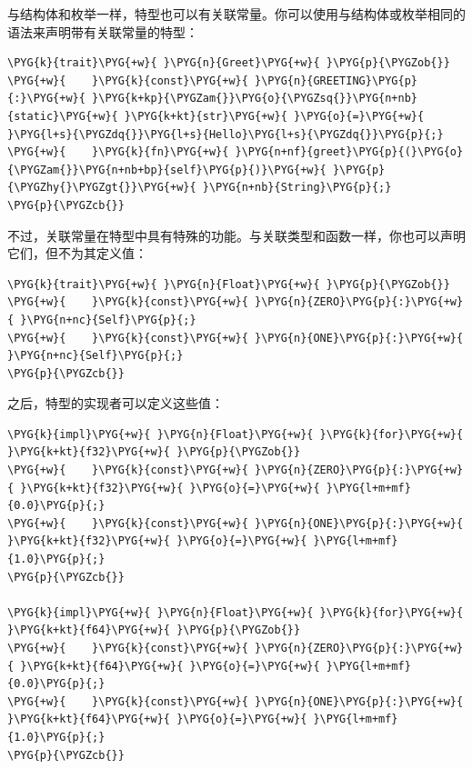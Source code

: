 与结构体和枚举一样，特型也可以有关联常量。你可以使用与结构体或枚举相同的语法来声明带有关联常量的特型：

\begin{Verbatim}[commandchars=\\\{\},breaklines=true,breakanywhere=true,fontsize=\codefont,xleftmargin=17bp]
\PYG{k}{trait}\PYG{+w}{ }\PYG{n}{Greet}\PYG{+w}{ }\PYG{p}{\PYGZob{}}
\PYG{+w}{    }\PYG{k}{const}\PYG{+w}{ }\PYG{n}{GREETING}\PYG{p}{:}\PYG{+w}{ }\PYG{k+kp}{\PYGZam{}}\PYG{o}{\PYGZsq{}}\PYG{n+nb}{static}\PYG{+w}{ }\PYG{k+kt}{str}\PYG{+w}{ }\PYG{o}{=}\PYG{+w}{ }\PYG{l+s}{\PYGZdq{}}\PYG{l+s}{Hello}\PYG{l+s}{\PYGZdq{}}\PYG{p}{;}
\PYG{+w}{    }\PYG{k}{fn}\PYG{+w}{ }\PYG{n+nf}{greet}\PYG{p}{(}\PYG{o}{\PYGZam{}}\PYG{n+nb+bp}{self}\PYG{p}{)}\PYG{+w}{ }\PYG{p}{\PYGZhy{}\PYGZgt{}}\PYG{+w}{ }\PYG{n+nb}{String}\PYG{p}{;}
\PYG{p}{\PYGZcb{}}
\end{Verbatim}

不过，关联常量在特型中具有特殊的功能。与关联类型和函数一样，你也可以声明它们，但不为其定义值：

\begin{Verbatim}[commandchars=\\\{\},breaklines=true,breakanywhere=true,fontsize=\codefont,xleftmargin=17bp]
\PYG{k}{trait}\PYG{+w}{ }\PYG{n}{Float}\PYG{+w}{ }\PYG{p}{\PYGZob{}}
\PYG{+w}{    }\PYG{k}{const}\PYG{+w}{ }\PYG{n}{ZERO}\PYG{p}{:}\PYG{+w}{ }\PYG{n+nc}{Self}\PYG{p}{;}
\PYG{+w}{    }\PYG{k}{const}\PYG{+w}{ }\PYG{n}{ONE}\PYG{p}{:}\PYG{+w}{ }\PYG{n+nc}{Self}\PYG{p}{;}
\PYG{p}{\PYGZcb{}}
\end{Verbatim}

之后，特型的实现者可以定义这些值：

\begin{Verbatim}[commandchars=\\\{\},breaklines=true,breakanywhere=true,fontsize=\codefont,xleftmargin=17bp]
\PYG{k}{impl}\PYG{+w}{ }\PYG{n}{Float}\PYG{+w}{ }\PYG{k}{for}\PYG{+w}{ }\PYG{k+kt}{f32}\PYG{+w}{ }\PYG{p}{\PYGZob{}}
\PYG{+w}{    }\PYG{k}{const}\PYG{+w}{ }\PYG{n}{ZERO}\PYG{p}{:}\PYG{+w}{ }\PYG{k+kt}{f32}\PYG{+w}{ }\PYG{o}{=}\PYG{+w}{ }\PYG{l+m+mf}{0.0}\PYG{p}{;}
\PYG{+w}{    }\PYG{k}{const}\PYG{+w}{ }\PYG{n}{ONE}\PYG{p}{:}\PYG{+w}{ }\PYG{k+kt}{f32}\PYG{+w}{ }\PYG{o}{=}\PYG{+w}{ }\PYG{l+m+mf}{1.0}\PYG{p}{;}
\PYG{p}{\PYGZcb{}}

\PYG{k}{impl}\PYG{+w}{ }\PYG{n}{Float}\PYG{+w}{ }\PYG{k}{for}\PYG{+w}{ }\PYG{k+kt}{f64}\PYG{+w}{ }\PYG{p}{\PYGZob{}}
\PYG{+w}{    }\PYG{k}{const}\PYG{+w}{ }\PYG{n}{ZERO}\PYG{p}{:}\PYG{+w}{ }\PYG{k+kt}{f64}\PYG{+w}{ }\PYG{o}{=}\PYG{+w}{ }\PYG{l+m+mf}{0.0}\PYG{p}{;}
\PYG{+w}{    }\PYG{k}{const}\PYG{+w}{ }\PYG{n}{ONE}\PYG{p}{:}\PYG{+w}{ }\PYG{k+kt}{f64}\PYG{+w}{ }\PYG{o}{=}\PYG{+w}{ }\PYG{l+m+mf}{1.0}\PYG{p}{;}
\PYG{p}{\PYGZcb{}}
\end{Verbatim}

